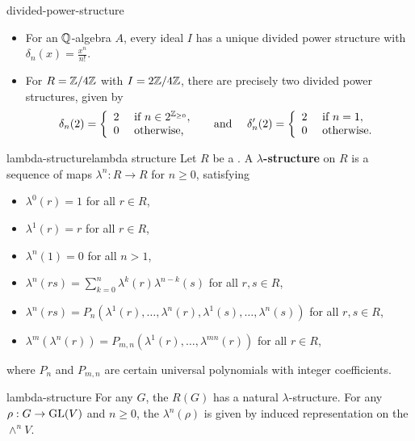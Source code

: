 \begin{example}{divided-power-structure}
    \begin{itemize}
        \item For an $\mathbb{Q}$-algebra $A$, every ideal $I$ has a unique divided power structure with $\delta_n(x) = \frac{x^n}{n!}$.
        \item For $R = \mathbb{Z}/4\mathbb{Z}$ with $I = 2\mathbb{Z}/4\mathbb{Z}$, there are precisely two divided power structures, given by
        \[ \delta_n(2) = \left\{ \begin{array}{cl} 2 & \textup{ if } n \in 2^{\mathbb{Z}_{\ge 0}} , \\ 0 & \textup{ otherwise,} \end{array} \right. \quad \textup{ and } \quad \delta'_n(2) = \left\{ \begin{array}{cl} 2 & \textup{ if } n = 1 , \\ 0 & \textup{ otherwise.} \end{array} \right. \]
    \end{itemize}
\end{example}

\begin{topic}{lambda-structure}{lambda structure}
    Let $R$ be a . A \textbf{$\lambda$-structure} on $R$ is a sequence of maps $\lambda^n : R \to R$ for $n \ge 0$, satisfying
    \begin{itemize}
        \item $\lambda^0(r) = 1$ for all $r \in R$,
        \item $\lambda^1(r) = r$ for all $r \in R$,
        \item $\lambda^n(1) = 0$ for all $n > 1$,
        \item $\lambda^{n}(rs) = \sum_{k = 0}^{n} \lambda^k(r) \lambda^{n - k}(s)$ for all $r, s \in R$,
        \item $\lambda^n(rs) = P_n(\lambda^1(r), \ldots, \lambda^n(r), \lambda^1(s), \ldots,  \lambda^n(s))$ for all $r, s \in R$,
        \item $\lambda^m(\lambda^n(r)) = P_{m, n}(\lambda^1(r), \ldots, \lambda^{mn}(r))$ for all $r \in R$,
    \end{itemize}
    where $P_n$ and $P_{m, n}$ are certain universal polynomials with integer coefficients.
\end{topic}

\begin{example}{lambda-structure}
    For any  $G$, the  $R(G)$ has a natural $\lambda$-structure. For any  $\rho : G \to \textup{GL}(V)$ and $n \ge 0$, the $\lambda^n(\rho)$ is given by induced representation on the  $\wedge^n V$.
\end{example}


